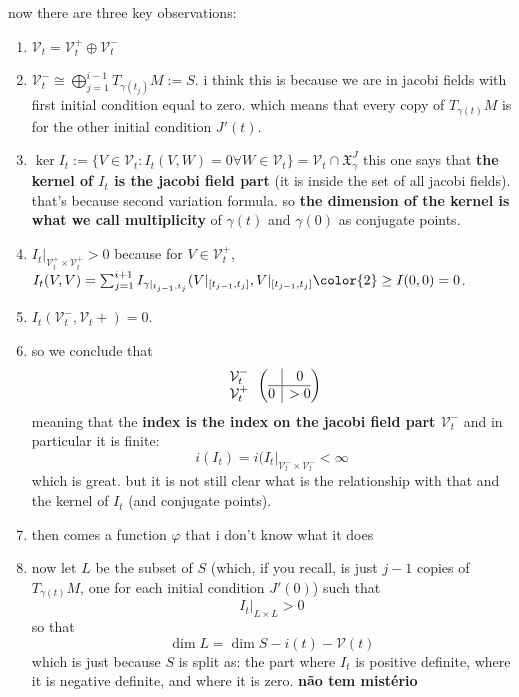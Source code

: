 now there are three key observations:
\begin{enumerate}
\item \(\mathcal{V}_t=\mathcal{V}_t^+ \oplus  \mathcal{V}_t^-\)
\item \(\mathcal{V}_t^- \cong \bigoplus_{j=1}^{i-1}T_{\gamma(t_j)}M:=S\). {\color{2}i think} this is because we are in jacobi fields with first initial condition equal to zero. which means that every copy of \(T_{\gamma(t)}M\) is for the other initial condition \(J'(t)\).
\item \(\ker I_t:=\{V \in \mathcal{V}_t:I_t(V,W)=0 \forall W \in \mathcal{V}_t\}=\mathcal{V}_t \cap \mathfrak{X}_\gamma^J\)
this one says that \textbf{the kernel of \(I_t\) is the jacobi field part} (it is inside the set of all jacobi fields). that's because second variation formula. so \textbf{the dimension of the kernel is what we call multiplicity} of \(\gamma(t)\) and \(\gamma(0)\) as conjugate points.
\item \(I_t|_{\mathcal{V}^+_t \times \mathcal{V}^+_t}>0\) because for \(V \in \mathcal{V}^+_t\), \(I_t(V,V)=\sum_{j=1}^{i+1}I_{\gamma|_{t_{j-1},t_j}}(V|_{[t_{j-1},t_j]},V|_{[t_{j-1},t_j]}{\color{2}\geq I(0,0)=0}\).
\item \(I_{t}(\mathcal{V}_t^-,\mathcal{V}_t+)=0\).
\item so we conclude that
	\[\begin{array}{c}
	\mathcal{V}_t^-\\
	 \mathcal{V}_t^+\end{array}\left(\begin{array}{@{}c|c@{}}
	&0\\
	\hline
	0&>0\end{array}\right)\]
meaning that the \textbf{index is the index on the jacobi field part \(\mathcal{V}^-_t\)} and in particular it is finite:
\[i(I_t)=i(I_t|_{\mathcal{V}_t^- \times \mathcal{V}_t^-}<\infty\]
which is great. but it is not still clear what is the relationship with that and the kernel of \(I_t\) (and conjugate points).
\item then comes a function \(\varphi\) that i don't know what it does
\item now let \(L\) be the subset of \(S\) (which, if you recall, is just \(j-1\) copies of  \(T_{\gamma(t)}M\), one for each initial condition \(J'(0)\)) such that
	 \[I_{t}|_{L \times L}>0\]
so that
\[\dim L=\dim S-i(t)-\mathcal{V}(t)\]
which is just because \(S\) is split as: the part where \(I_t\) is positive definite, where it is negative definite, and where it is zero. \textbf{não tem mistério}

\end{enumerate}
